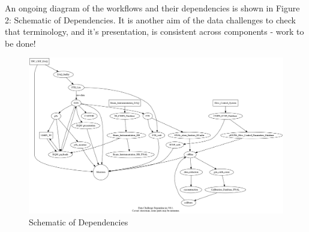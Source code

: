 \documentclass[pdftex,12pt,letter]{article}
\begin{document}
An ongoing diagram of the workflows and their dependencies is shown in Figure 2: Schematic of Dependencies. It is another aim of the data challenges to check that terminology, and it's presentation, is consistent across components - work to be done!

\begin{figure}[tbh]
  \centering
  \includegraphics[width=1.0\textwidth]{../figures/dc1_integration.png}
  \caption{Schematic of Dependencies}
  \label{fig:dependencies}
\end{figure}
\end{document}
